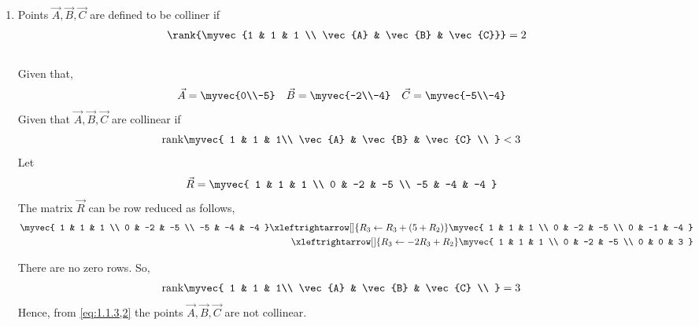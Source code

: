 \documentclass[11pt]{book}
\begin{document}
\begin{enumerate}[label=\thesection.\arabic*.,ref=\thesection.\theenumi]
\item Points $\vec{A}, \vec{B}, \vec{C}$ are defined to be colliner if
	\begin{align}
		\rank{\myvec{1 & 1 & 1 \\ \vec{A} & \vec{B} & \vec{C}}} = 2
	\end{align}
\solution\\
Given that,
\begin{align}
    \vec{A} = \myvec{0\\-5}
    \quad
    \vec{B} &= \myvec{-2\\-4}
    \quad
    \vec{C} = \myvec{-5\\-4}
\end{align}
Given that $\vec{A},\vec{B},\vec{C}$ are collinear if
\begin{align}
    \text{rank}\myvec{
    1 & 1 & 1\\
    \vec{A} & \vec{B} & \vec{C} \\
    } &< 3 
    \label{eq:1.1.3,2}
\end{align} 
Let
\begin{align}
    \vec{R}&=\myvec{
    1 & 1 & 1
    \\
    0 & -2 & -5
    \\
    -5 & -4 & -4
    } 
\end{align} 
The matrix $\vec{R}$ can be row reduced as follows,
\begin{align}
    \label{eq:matthrowoperations}
    \myvec{
    1 & 1 & 1
    \\
    0 & -2 & -5
    \\
    -5 & -4 & -4
    }
	\xleftrightarrow[]{R_3 \leftarrow R_3+(5+R_2)}
    \myvec{
    1 & 1 & 1
    \\
    0 & -2 & -5
    \\
    0 & -1 & -4 
    }
    \\
     \xleftrightarrow[]{R_3\leftarrow -2R_3+R_2}
    \myvec{
    1 & 1 & 1
    \\
    0 & -2 & -5
    \\
    0 & 0 & 3
    }
\end{align}

There are no zero rows. So,
\begin{align}
    \text{rank}\myvec{
    1 & 1 & 1\\
    \vec{A} & \vec{B} & \vec{C} \\
    } &= 3 
\end{align}  
Hence, from \eqref{eq:1.1.3,2} the points $\vec{A},\vec{B},\vec{C}$ are not collinear. 


\end{enumerate}
\end{document}
